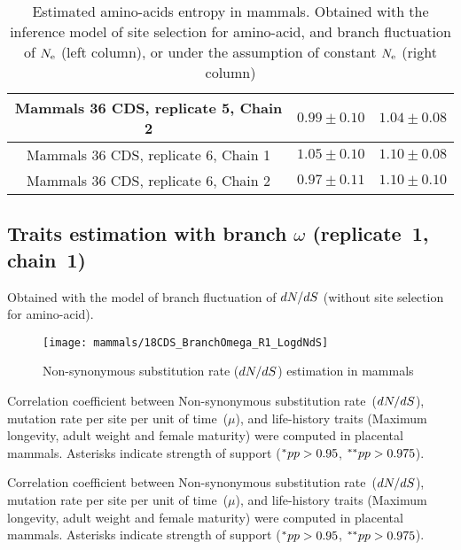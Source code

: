 \begin{table}[H]
{\begin{tabu}{|c|c|c|}
        Mammals 36 CDS, replicate 5, Chain 2 & $0.99 \pm 0.10$ & $1.04 \pm 0.08$\\ \hline
        Mammals 36 CDS, replicate 6, Chain 1 & $1.05 \pm 0.10$ & $1.10 \pm 0.08$\\ \hline
        Mammals 36 CDS, replicate 6, Chain 2 & $0.97 \pm 0.11$ & $1.10 \pm 0.10$\\ \hline
    \end{tabu}}
    \caption[Entropy of amino-acids in mammals]{Estimated amino-acids entropy in mammals.
    Obtained with the inference model of site selection for amino-acid, and branch fluctuation of $N_{\mathrm{e}}$ (left column), or under the assumption of constant $N_{\mathrm{e}}$ (right column)}
    \label{tab:table-entropy-aa-mutselne}
\end{table}

\subsection{Traits estimation with branch \texorpdfstring{$\omega$}{ω} (replicate~1, chain~1)}
Obtained with the model of branch fluctuation of $\dnds$ (without site selection for amino-acid).

\begin{figure}[H]
    \centering
    \texttt{[image: mammals/18CDS\_BranchOmega\_R1\_LogdNdS]}
    \caption[$\dnds$ estimation in mammals]{{Non-synonymous substitution} rate ($\dnds$) estimation in mammals}
\end{figure}

\begin{table}[H]
    
    \caption[Correlation coefficient matrix in mammals ($\dnds$)]{
    Correlation coefficient between Non-synonymous \gls{substitution} rate~($\dnds$), mutation rate per site per unit of time~($\mu$), and life-history traits (Maximum longevity, adult weight and female maturity) were computed in placental mammals.
    Asterisks indicate strength of support ($\smash{^{*}} pp > 0.95$, $\smash{^{**}} pp > 0.975$).}
\end{table}

\begin{table}[H]
    
    \caption[Covariance matrix in mammals ($\dnds$)]{
    Correlation coefficient between Non-synonymous \gls{substitution} rate~($\dnds$), mutation rate per site per unit of time~($\mu$), and life-history traits (Maximum longevity, adult weight and female maturity) were computed in placental mammals.
    Asterisks indicate strength of support ($\smash{^{*}} pp > 0.95$, $\smash{^{**}} pp > 0.975$).}
\end{table}

